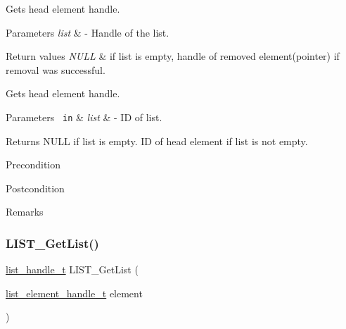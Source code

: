 Gets head element handle. 


\begin{DoxyParams}{Parameters}
{\em list} & -\/ Handle of the list.\\
\hline
\end{DoxyParams}

\begin{DoxyRetVals}{Return values}
{\em N\+U\+LL} & if list is empty, handle of removed element(pointer) if removal was successful.\\
\hline
\end{DoxyRetVals}
Gets head element handle.



 
\begin{DoxyParams}[1]{Parameters}
\mbox{\texttt{ in}}  & {\em list} & -\/ ID of list.\\
\hline
\end{DoxyParams}
\begin{DoxyReturn}{Returns}
N\+U\+LL if list is empty. ID of head element if list is not empty.
\end{DoxyReturn}
\begin{DoxyPrecond}{Precondition}

\end{DoxyPrecond}
\begin{DoxyPostcond}{Postcondition}

\end{DoxyPostcond}
\begin{DoxyRemark}{Remarks}
\begin{DoxyVerb}\end{DoxyVerb}
 
\end{DoxyRemark}
\mbox{\label{group___generic_list_gac2821270f5b05d6e5a492dca3b7a5a07}} 
\subsubsection{\texorpdfstring{LIST\_GetList()}{LIST\_GetList()}}
{\footnotesize\ttfamily \mbox{\hyperlink{structlist__label}{list\+\_\+handle\+\_\+t}} L\+I\+S\+T\+\_\+\+Get\+List (\begin{DoxyParamCaption}\item[{\mbox{\hyperlink{structlist__element__tag}{list\+\_\+element\+\_\+handle\+\_\+t}}}]{element }\end{DoxyParamCaption})}



